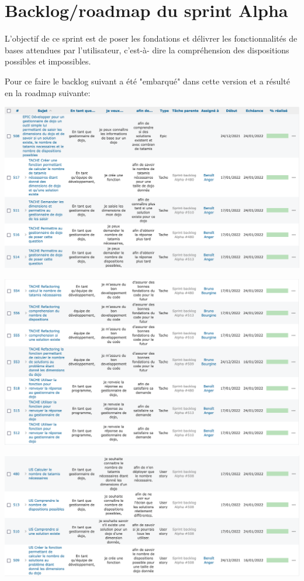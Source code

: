 \section{Backlog/roadmap du sprint Alpha}

L’objectif de ce sprint est de poser les fondations et délivrer les fonctionnalités de bases attendues par l’utilisateur,
c'est-à- dire la compréhension des dispositions possibles et impossibles.

Pour ce faire le backlog suivant a été "embarqué" dans cette version et a résulté en la roadmap suivante:

\begin{center}
      \includegraphics[width=17cm]{images/roadmap-alpha-part1.png}
\end{center}

\begin{center}
      \includegraphics[width=17cm]{images/roadmap-alpha-part2.png}

      \includegraphics[width=17cm]{images/roadmap-alpha-part3.png}
\end{center}

